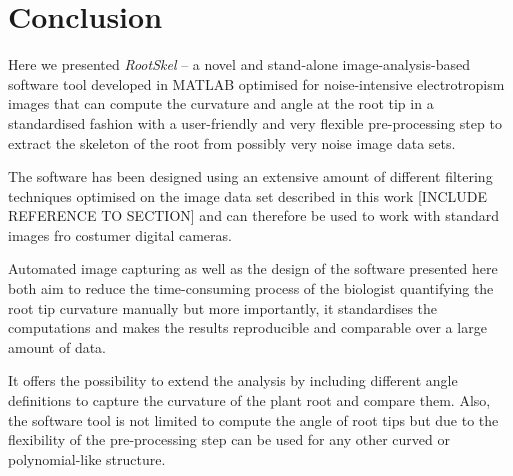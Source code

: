 
\chapter{Conclusion} %

\label{conclusion} %

%






Here we presented \textit{RootSkel} -- a novel and stand-alone image-analysis-based software tool developed in MATLAB optimised for noise-intensive electrotropism images that can  compute the curvature and angle at the root tip in a standardised fashion with a user-friendly and very flexible pre-processing step to extract the skeleton of the root from possibly very noise image data sets.

The software has been designed using an extensive amount of different filtering techniques optimised on the image data set described in this work [INCLUDE REFERENCE TO SECTION] and can therefore be used to work with standard images fro costumer digital cameras. 

Automated image capturing as well as the design of the software presented here both aim to reduce the time-consuming process of the biologist quantifying the root tip curvature manually but more importantly, it standardises the computations and makes the results reproducible and comparable over a large amount of data. 

It offers the possibility to extend the analysis by including different angle definitions to capture the curvature of the plant root and compare them. Also, the software tool is not limited to compute the angle of root tips but due to the flexibility of the pre-processing step can be used for any other curved or polynomial-like structure. 

